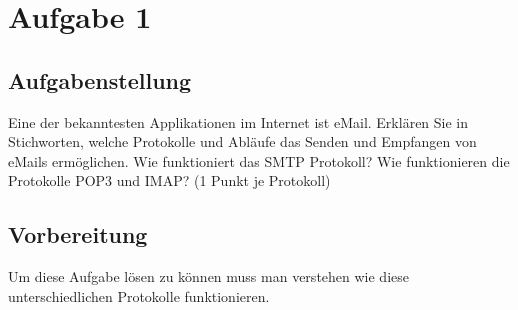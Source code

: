 \newpage
\section{Aufgabe 1}

\subsection{Aufgabenstellung}
Eine der bekanntesten Applikationen im Internet ist eMail. Erklären Sie in Stichworten, welche Protokolle und Abläufe das Senden und Empfangen von eMails ermöglichen. Wie funktioniert das
SMTP Protokoll? Wie funktionieren die Protokolle POP3 und IMAP? (1 Punkt je Protokoll)

\subsection{Vorbereitung}
Um diese Aufgabe lösen zu können muss man verstehen wie diese unterschiedlichen Protokolle funktionieren. 

